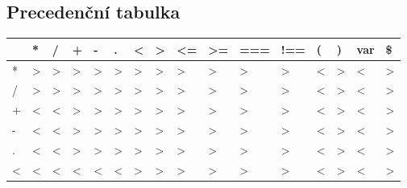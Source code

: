 \documentclass[11pt,a4paper]{article}
\renewcommand{\familydefault}{\sfdefault}
\begin{document}
    \renewcommand{\familydefault}{\sfdefault}

    \subsection{Precedenční tabulka}
    \renewcommand{\familydefault}{\ttdefault}

    \begin{table}[h!]
        \begin{tabular}{|l|l|l|l|l|l|l|l|l|l|l|l|l|l|l|l|}
        \hline
                        & *              & /              & +              & -              & .              & \textless{}    & \textgreater{} & \textless{}=   & \textgreater{}= & ===            & !==            & (           & )              & var         & \$             \\ \hline
        *               & \textgreater{} & \textgreater{} & \textgreater{} & \textgreater{} & \textgreater{} & \textgreater{} & \textgreater{} & \textgreater{} & \textgreater{}  & \textgreater{} & \textgreater{} & \textless{} & \textgreater{} & \textless{} & \textgreater{} \\ \hline
        /               & \textgreater{} & \textgreater{} & \textgreater{} & \textgreater{} & \textgreater{} & \textgreater{} & \textgreater{} & \textgreater{} & \textgreater{}  & \textgreater{} & \textgreater{} & \textless{} & \textgreater{} & \textless{} & \textgreater{} \\ \hline
        +               & \textless{}    & \textless{}    & \textgreater{} & \textgreater{} & \textgreater{} & \textgreater{} & \textgreater{} & \textgreater{} & \textgreater{}  & \textgreater{} & \textgreater{} & \textless{} & \textgreater{} & \textless{} & \textgreater{} \\ \hline
        -               & \textless{}    & \textless{}    & \textgreater{} & \textgreater{} & \textgreater{} & \textgreater{} & \textgreater{} & \textgreater{} & \textgreater{}  & \textgreater{} & \textgreater{} & \textless{} & \textgreater{} & \textless{} & \textgreater{} \\ \hline
        .               & \textless{}    & \textless{}    & \textgreater{} & \textgreater{} & \textgreater{} & \textgreater{} & \textgreater{} & \textgreater{} & \textgreater{}  & \textgreater{} & \textgreater{} & \textless{} & \textgreater{} & \textless{} & \textgreater{} \\ \hline
        \textless{}     & \textless{}    & \textless{}    & \textless{}    & \textless{}    & \textless{}    & \textgreater{} & \textgreater{} & \textgreater{} & \textgreater{}  & \textgreater{} & \textgreater{} & \textless{} & \textgreater{} & \textless{} & \textgreater{} \\ \hline

\end{tabular}
\end{table}
\end{document}
